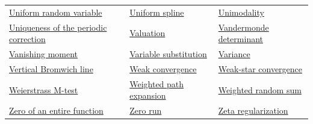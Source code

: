 \documentclass[11pt,oneside]{article}
\begin{document}
\begin{longtable}{p{}p{}p{}}
\hyperlink{gls:uniform-random-variable}{Uniform random variable} & \hyperlink{gls:uniform-spline}{Uniform spline} & \hyperlink{gls:unimodality}{Unimodality} \\
\hyperlink{gls:uniqueness-of-periodic-correction}{Uniqueness of the periodic correction} & \hyperlink{gls:valuation}{Valuation} & \hyperlink{gls:vandermonde-determinant}{Vandermonde determinant} \\
\hyperlink{gls:vanishing-moment}{Vanishing moment} & \hyperlink{gls:variable-substitution}{Variable substitution} & \hyperlink{gls:variance}{Variance} \\
\hyperlink{gls:vertical-bromwich-line}{Vertical Bromwich line} & \hyperlink{gls:weak-convergence}{Weak convergence} & \hyperlink{gls:weak-star-convergence}{Weak-star convergence} \\
\hyperlink{gls:weierstrass-m-test}{Weierstrass M-test} & \hyperlink{gls:weighted-path-expansion}{Weighted path expansion} & \hyperlink{gls:weighted-random-sum}{Weighted random sum} \\
\hyperlink{gls:zero-of-entire-function}{Zero of an entire function} & \hyperlink{gls:zero-run}{Zero run} & \hyperlink{gls:zeta-regularization}{Zeta regularization} \\
\end{longtable}\endgroup\newpage
\end{document}
